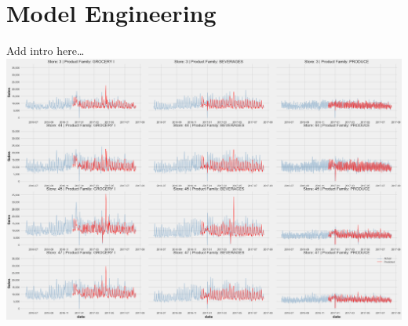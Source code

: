 \documentclass[12pt]{article}
\begin{document}
\section{Model Engineering}
Add intro here\dots \\
\includegraphics[width=\textwidth]{figures/XGBoost.png}
\end{document}
